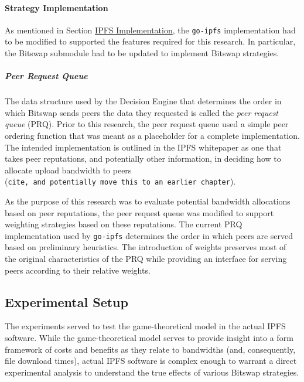\hypertarget{strategy-implementation}{%
\paragraph{Strategy Implementation}\label{strategy-implementation}}

As mentioned in Section \protect\hyperlink{ipfs-implementation}{IPFS
Implementation}, the \texttt{go-ipfs} implementation had to be modified
to supported the features required for this research. In particular, the
Bitswap submodule had to be updated to implement Bitswap strategies.

\hypertarget{peer-request-queue}{%
\subparagraph{Peer Request Queue}\label{peer-request-queue}}

The data structure used by the Decision Engine that determines the order
in which Bitswap sends peers the data they requested is called the
\emph{peer request queue} (PRQ). Prior to this research, the peer
request queue used a simple peer ordering function that was meant as a
placeholder for a complete implementation. The intended implementation
is outlined in the IPFS whitepaper as one that takes peer reputations,
and potentially other information, in deciding how to allocate upload
bandwidth to peers
(\texttt{cite,\ and\ potentially\ move\ this\ to\ an\ earlier chapter}).

As the purpose of this research was to evaluate potential bandwidth
allocations based on peer reputations, the peer request queue was
modified to support weighting strategies based on these reputations.
The current PRQ implementation used by \texttt{go-ipfs} determines the
order in which peers are served based on preliminary heuristics.
The introduction of weights preserves most of the original characteristics
of the PRQ while providing an interface for serving peers according
to their relative weights.

\hypertarget{experimental-setup}{%
\subsection{Experimental Setup}\label{experimental-setup}}

The experiments served to test the game-theoretical model in the actual
IPFS software. While the game-theoretical model serves to provide insight
into a form framework of costs and benefits as they relate to bandwidths
(and, consequently, file download times), actual IPFS software is complex
enough to warrant a direct experimental analysis to understand the true
effects of various Bitswap strategies.

